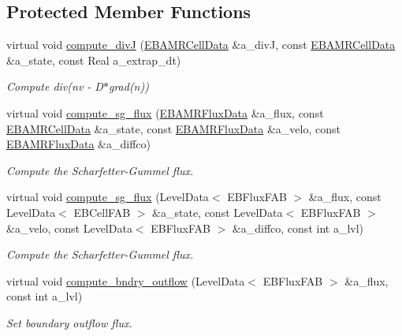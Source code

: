 \subsection*{Protected Member Functions}
\begin{DoxyCompactItemize}
\item 
virtual void \hyperlink{classcdr__sg_a4f49be22dc76424a07db3043a73e0a51}{compute\+\_\+divJ} (\hyperlink{type__definitions_8H_a7e610f301989e5e07781c5e338bdb7c3}{E\+B\+A\+M\+R\+Cell\+Data} \&a\+\_\+divJ, const \hyperlink{type__definitions_8H_a7e610f301989e5e07781c5e338bdb7c3}{E\+B\+A\+M\+R\+Cell\+Data} \&a\+\_\+state, const Real a\+\_\+extrap\+\_\+dt)
\begin{DoxyCompactList}\small\item\em Compute div(nv -\/ D$\ast$grad(n)) \end{DoxyCompactList}\item 
virtual void \hyperlink{classcdr__sg_a76d7d15c951064e163188f88576a5d2d}{compute\+\_\+sg\+\_\+flux} (\hyperlink{type__definitions_8H_aadad278b2e5d3d4abcf9032f90ba78c3}{E\+B\+A\+M\+R\+Flux\+Data} \&a\+\_\+flux, const \hyperlink{type__definitions_8H_a7e610f301989e5e07781c5e338bdb7c3}{E\+B\+A\+M\+R\+Cell\+Data} \&a\+\_\+state, const \hyperlink{type__definitions_8H_aadad278b2e5d3d4abcf9032f90ba78c3}{E\+B\+A\+M\+R\+Flux\+Data} \&a\+\_\+velo, const \hyperlink{type__definitions_8H_aadad278b2e5d3d4abcf9032f90ba78c3}{E\+B\+A\+M\+R\+Flux\+Data} \&a\+\_\+diffco)
\begin{DoxyCompactList}\small\item\em Compute the Scharfetter-\/\+Gummel flux. \end{DoxyCompactList}\item 
virtual void \hyperlink{classcdr__sg_aab3209fe4c39539e830ddf410d632e61}{compute\+\_\+sg\+\_\+flux} (Level\+Data$<$ E\+B\+Flux\+F\+AB $>$ \&a\+\_\+flux, const Level\+Data$<$ E\+B\+Cell\+F\+AB $>$ \&a\+\_\+state, const Level\+Data$<$ E\+B\+Flux\+F\+AB $>$ \&a\+\_\+velo, const Level\+Data$<$ E\+B\+Flux\+F\+AB $>$ \&a\+\_\+diffco, const int a\+\_\+lvl)
\begin{DoxyCompactList}\small\item\em Compute the Scharfetter-\/\+Gummel flux. \end{DoxyCompactList}\item 
virtual void \hyperlink{classcdr__sg_a192188507a4cd99340449b611469f8dc}{compute\+\_\+bndry\+\_\+outflow} (Level\+Data$<$ E\+B\+Flux\+F\+AB $>$ \&a\+\_\+flux, const int a\+\_\+lvl)
\begin{DoxyCompactList}\small\item\em Set boundary outflow flux. \end{DoxyCompactList}\end{DoxyCompactItemize}
